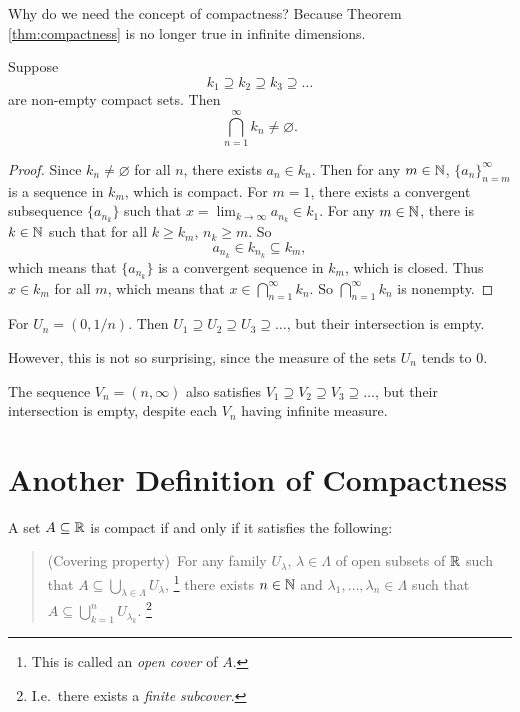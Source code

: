 \begin{remark}
  Why do we need the concept of compactness? Because Theorem
  \ref{thm:compactness} is no longer true in infinite dimensions.
\end{remark}

\begin{theorem}
  Suppose
  \[k_1 \supseteq k_2 \supseteq k_3 \supseteq \dots\]
  are non-empty compact sets. Then
  \[
    \bigcap_{n = 1}^\infty k_n \ne \varnothing
  .\]
\end{theorem}

\begin{proof}
  Since $k_n \ne \varnothing$ for all $n$, there exists
  $a_n \in k_n$. Then for any $m \in \mathbb{N}$,
  $\{a_n\}_{n = m}^\infty$ is a sequence
  in $k_m$, which is compact. For $m = 1$,
  there exists a convergent
  subsequence $\{a_{n_k}\}$ such that
  $x = \lim_{k \to \infty} a_{n_k} \in k_1$. For any
  $m \in \mathbb{N}$, there is $k \in \mathbb{N}$ such that for all
  $k \ge k_m$, $n_k \ge m$. So
  \[a_{n_k} \in k_{n_k} \subseteq k_m,\]
  which means that $\{a_{n_k}\}$ is a convergent sequence
  in $k_m$, which is closed. Thus $x \in k_m$ for all
  $m$, which means that $x \in \bigcap_{n = 1}^\infty k_n$.
  So $\bigcap_{n = 1}^\infty k_n$ is nonempty.
\end{proof}

\begin{example}
  For $U_n = (0, 1 / n)$. Then
  $U_1 \supseteq U_2 \supseteq U_3 \supseteq \dots$, but
  their intersection is empty.
\end{example}

However, this is not so surprising, since the measure of
the sets $U_n$ tends to 0.

\begin{example}
  The sequence $V_n = (n, \infty)$ also satisfies
  $V_1 \supseteq V_2 \supseteq V_3 \supseteq \dots$,
  but their intersection is empty, despite each $V_n$ having
  infinite measure.
\end{example}

\section{Another Definition of Compactness}

\begin{theorem}
  A set $A \subseteq \mathbb{R}$ is compact if and only if
  it satisfies the following:
  \begin{quote}
    (Covering property)\,
    For any family $U_\lambda$, $\lambda \in \Lambda$ of
    open subsets of $\mathbb{R}$ such that
    $A \subseteq \bigcup_{\lambda \in \Lambda} U_\lambda$,
    \footnote{This is called an \textit{open cover} of $A$.}
    there exists $n \in \mathbb{N}$ and
    $\lambda_1, \dots, \lambda_n \in \Lambda$ such that
    $A \subseteq \bigcup_{k = 1}^n U_{\lambda_k}$.
    \footnote{I.e.~there exists a \textit{finite subcover}.}
  \end{quote}
\end{theorem}

